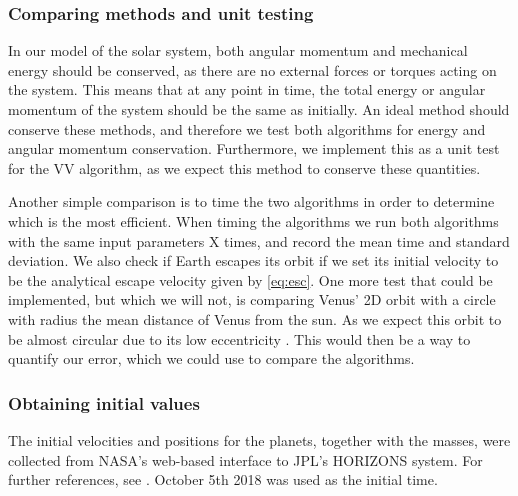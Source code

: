 \subsubsection{Comparing methods and unit testing} \label{sec:tests}
In our model of the solar system, both angular momentum and mechanical energy should be conserved, as there
are no external forces or torques acting on the system. This means that at any point in time, the total energy or
angular momentum of the system should be the same as initially. An ideal method should conserve these methods,
and therefore we test both algorithms for energy and angular momentum conservation.
Furthermore, we implement this as a unit test for the VV algorithm, as we expect this method to conserve these quantities.

Another simple comparison is to time the two algorithms in order to determine which is the most efficient. When timing the algorithms we run both algorithms with the same input parameters X times, and record the mean time and standard deviation.
We also check if Earth escapes its orbit if we set its initial velocity to be the analytical
escape velocity given by \ref{eq:esc}.
One more test that could be implemented, but which we will not, is comparing Venus' 2D orbit with a circle
with radius the mean distance of Venus from the sun. As we expect this orbit to be
almost circular due to its low eccentricity \cite{planetaryfactsheet}. This would then
be a way to quantify our error, which we could use to compare the algorithms.

\subsubsection{Obtaining initial values}
The initial velocities and positions for the planets, together with the masses, were collected from NASA's web-based interface to JPL's HORIZONS system. For further references, see \cite{horizon}. October 5th 2018 was used as the initial time.

